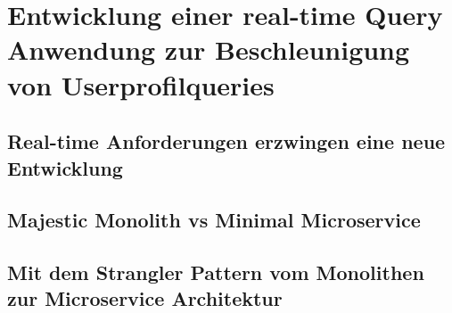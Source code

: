 \chapter{Entwicklung einer real-time Query Anwendung zur Beschleunigung von Userprofilqueries}

\section{Real-time Anforderungen erzwingen eine neue Entwicklung}

\section{Majestic Monolith vs Minimal Microservice}

\section{Mit dem Strangler Pattern vom Monolithen zur Microservice Architektur}